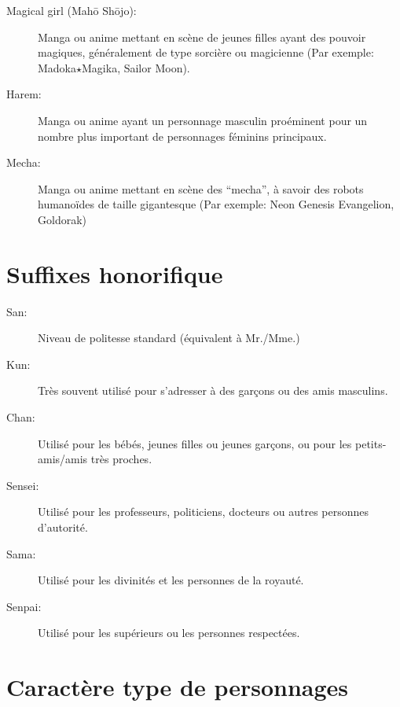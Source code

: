 \begin{description}
	\item[Magical girl (Mah\=o Sh\=ojo):] Manga ou anime mettant en scène de
		jeunes filles ayant des pouvoir magiques, généralement de type sorcière
		ou magicienne (Par exemple: Madoka$\star$Magika, Sailor Moon).
	\item[Harem:] Manga ou anime ayant un personnage masculin proéminent pour
		un nombre plus important de personnages féminins principaux.
	\item[Mecha:] Manga ou anime mettant en scène des ``mecha'', à savoir des
		robots humanoïdes de taille gigantesque (Par exemple: Neon Genesis
		Evangelion, Goldorak)
\end{description}

\section{Suffixes honorifique}

\begin{description}
	\item[San:] Niveau de politesse standard (équivalent à Mr./Mme.)
	\item[Kun:] Très souvent utilisé pour s'adresser à des garçons ou des amis
		masculins.
	\item[Chan:] Utilisé pour les bébés, jeunes filles ou jeunes garçons, ou
		pour les petits-amis/amis très proches.
	\item[Sensei:] Utilisé pour les professeurs, politiciens, docteurs ou
		autres personnes d'autorité.
	\item[Sama:] Utilisé pour les divinités et les personnes de la royauté.
	\item[Senpai:] Utilisé pour les supérieurs ou les personnes respectées.
\end{description}

\section{Caractère type de personnages}

